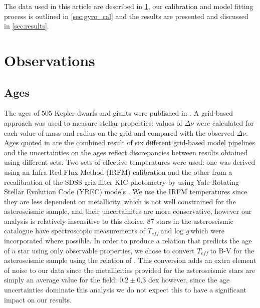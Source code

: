 \documentclass[10pt,preprint]{aastex}
\newcommand{\logg}{log \emph{g}}
\newcommand{\teff}{$T_{eff}$}
\begin{document}
The data used in this article are described in \textsection \ref{sec:data}, our calibration and model fitting process is outlined in \textsection \ref{sec:gyro_cal} and the results are presented and discussed in \textsection \ref{sec:results}.

\section{Observations}
\label{sec:data}

\subsection{Ages}
\label{sec:ages}

The ages of 505 Kepler dwarfs and giants were published in \citet{Chaplin2013}.
A grid-based approach was used to measure stellar properties: values of $\Delta\nu$ were calculated for each value of mass and radius on the grid and compared with the observed $\Delta\nu$.
Ages quoted in \citet{Chaplin2013} are the combined result of six different grid-based model pipelines and the uncertainties on the ages reflect discrepancies between results obtained using different sets.
Two sets of effective temperatures were used: one was derived using an Infra-Red Flux Method (IRFM) calibration \citep{Casagrande2010, SilvaAguirre2012} and the other from a recalibration of the SDSS griz filter KIC photometry by \citet{Pinsonneault2012} using Yale Rotating Stellar Evolution Code (YREC) models \citep{Demarque2004}.
We use the IRFM temperatures since they are less dependent on metallicity, which is not well constrained for the asteroseismic sample, and their uncertainites are more conservative, however our analysis is relatively insensitive to this choice.
87 stars in the asteroseismic catalogue have spectroscopic measurements of \teff$~$and \logg$~$which were incorporated where possible.
In order to produce a relation that predicts the age of a star using only observable properties, we chose to convert \teff$~$to B-V for the asteroseismic sample using the relation of \citet{Sekiguchi2000}.
This conversion adds an extra element of noise to our data since the metallicities provided for the asteroseismic stars are simply an average value for the field: $0.2\pm0.3$ dex \citep[see e.g.][]{Silva_Aguirre2011} however, since the age uncertainties dominate this analysis we do not expect this to have a significant impact on our results.
\end{document}

